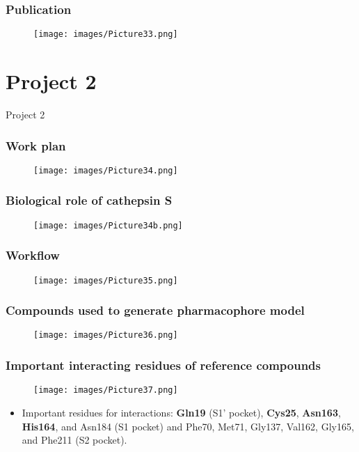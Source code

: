 \documentclass{beamer}
\begin{document}
\begin{frame}
\frametitle{\textbf{Publication}}
\begin{figure}
\texttt{[image: images/Picture33.png]}
\end{figure}
\end{frame}

\section{Project 2}

\begin{frame}
\begin{block}
\Huge{\centerline{Project 2}}
\end{block}
\end{frame}

\begin{frame}
\frametitle{\textbf{Work plan}}
\begin{figure}
\texttt{[image: images/Picture34.png]}
\end{figure}
\end{frame}

\begin{frame}
\frametitle{\textbf{Biological role of cathepsin S}}
\begin{figure}
\texttt{[image: images/Picture34b.png]}
\end{figure}
\end{frame}

\begin{frame}
\frametitle{\textbf{Workflow}}
\begin{figure}
\texttt{[image: images/Picture35.png]}
\end{figure}
\end{frame}

\begin{frame}
\frametitle{\textbf{Compounds used to generate pharmacophore model}}
\begin{figure}
\texttt{[image: images/Picture36.png]}
\end{figure}
\end{frame}

\begin{frame}
\frametitle{\textbf{Important interacting residues of reference compounds}}
\begin{figure}
\texttt{[image: images/Picture37.png]}
\end{figure}
\begin{itemize}
\item Important residues for interactions: \textbf{Gln19} (S1’ pocket), \textbf{Cys25}, \textbf{Asn163}, \textbf{His164}, and Asn184 (S1 pocket) and Phe70, Met71, Gly137, Val162, Gly165, and Phe211 (S2 pocket).
\end{itemize}
\end{frame}
\end{document}
